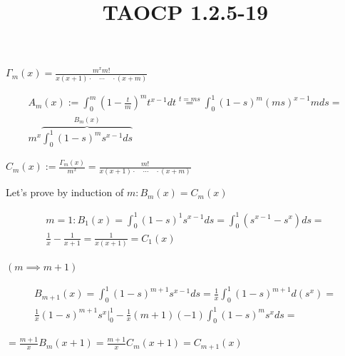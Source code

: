 \documentclass{article}
\title{TAOCP 1.2.5\mbox{-}19}
\begin{document}
\maketitle

\( \Gamma_{m}(x) = \frac{m^{x} m!}{x(x+1)\cdot\quad\cdots\quad\cdot(x+m)} \)

\begin{multline*}
A_{m}(x) := \int_{0}^{m} {(1-\frac{t}{m})}^{m} t^{x-1}dt \overset{t=ms}{=} \int_{0}^{1} {(1-s)}^{m}{(ms)}^{x-1}mds = \\
m^{x} \overbrace{\int_{0}^{1} {(1-s)}^{m}s^{x-1}ds}^{B_{m}(x)}
\end{multline*}

\( C_{m}(x) := \frac{\Gamma_{m}(x)}{m^{x}} = \frac{m!}{x(x+1)\cdot\quad\cdots\quad\cdot(x+m)} \)

Let's prove by induction of \( m: B_{m}(x) = C_{m}(x) \)

\begin{multline*}
m = 1: B_{1}(x) = \int_{0}^{1} {(1-s)}^{1} s^{x-1}ds = \int_{0}^{1} (s^{x-1}-s^{x})ds = \\
\frac{1}{x} - \frac{1}{x+1} = \frac{1}{x(x+1)} = C_{1}(x)
\end{multline*}

\( (m \implies m + 1) \)

\begin{multline*}
B_{m+1}(x) = \int_{0}^{1} {(1-s)}^{m+1}s^{x-1}ds = \frac{1}{x} \int_{0}^{1} {(1-s)}^{m+1}d(s^{x}) = \\
\frac{1}{x}{(1-s)}^{m+1}s^{x} \Big|_{0}^{1} - \frac{1}{x} (m+1)(-1) \int_{0}^{1} {(1-s)}^{m}s^{x}ds =
\end{multline*}

\( = \frac{m+1}{x} B_{m}(x+1) = \frac{m+1}{x} C_{m}(x+1) = C_{m+1}(x) \)
\end{document}
